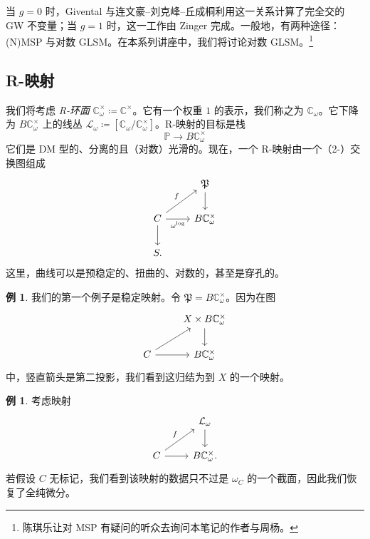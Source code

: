 \documentclass{amsart}
\theoremstyle{definition}
\newtheorem{exm}[thm]{例}
\theoremstyle{remark}
\theoremstyle{plain}
\theoremstyle{definition}
\theoremstyle{remark}
\newcommand{\C}{\mathbb{C}}
\renewcommand{\P}{\mathbb{P}}
\newcommand{\mc}[1]{\mathcal{#1}}
\newcommand{\mf}[1]{\mathfrak{#1}}
\newcommand{\1}{\mathbf{1}}
\newcommand{\2}{\mathbf{2}}
\newcommand{\3}{\mathbf{3}}
\begin{document}
当 \(g = 0\) 时，Givental 与连文豪–刘克峰–丘成桐利用这一关系计算了完全交的 GW 不变量；当 \(g = 1\) 时，这一工作由 Zinger 完成。一般地，有两种途径：(N)MSP 与对数 GLSM。在本系列讲座中，我们将讨论对数 GLSM。\footnote{陈琪乐让对 MSP 有疑问的听众去询问本笔记的作者与周杨。}

\subsection{R-映射}%
\label{sub:R-maps}

我们将考虑 \textit{R-环面} \(\C^{\times}_{\omega} \coloneqq \C^{\times}\)。它有一个权重 \(1\) 的表示，我们称之为 \(\C_{\omega}\)。它下降为 \(B \C_{\omega}^{\times}\) 上的线丛 \(\mc{L}_{\omega} \coloneqq [\C_{\omega} / \C^{\times}_{\omega}]\)。R-映射的目标是栈
\[ \P \to B \C^{\times}_{\omega} \]
它们是 DM 型的、分离的且（对数）光滑的。现在，一个 R-映射由一个（2-）交换图组成
\begin{equation*}
\begin{tikzcd}
    & \mf{P} \ar{d} \\
    C \ar{ur}{f} \ar{r}[swap]{\omega^{\log}} \ar{d} & B \C_{\omega}^{\times} \\
    S.
\end{tikzcd}
\end{equation*}
这里，曲线可以是预稳定的、扭曲的、对数的，甚至是穿孔的。

\begin{exm}
    我们的第一个例子是稳定映射。令 \(\mf{P} = B\C_{\omega}^{\times}\)。因为在图
    \begin{equation*}
    \begin{tikzcd}
        & X \times B\C_{\omega}^{\times} \ar{d} \\
        C \ar{ur} \ar{r} & B \C_{\omega}^{\times}
    \end{tikzcd}
    \end{equation*}
    中，竖直箭头是第二投影，我们看到这归结为到 \(X\) 的一个映射。
\end{exm}

\begin{exm}
    考虑映射
    \begin{equation*}
    \begin{tikzcd}
        & \mc{L}_{\omega} \ar{d} \\
        C \ar{ur}{f} \ar{r} & B \C_{\omega}^{\times}.
    \end{tikzcd}
    \end{equation*}
    若假设 \(C\) 无标记，我们看到该映射的数据只不过是 \(\omega_C\) 的一个截面，因此我们恢复了全纯微分。
\end{exm}
\end{document}
